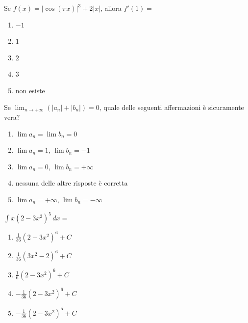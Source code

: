 \begin{quiz}
Se $f(x)=|\cos(\pi x)|^3+2|x|$, allora $f\prime(1)=$
\begin{enumerate}[label=\alph*),leftmargin=1.3cm,itemsep=3pt,topsep=5pt]
\item $-1$
\item $1$
\item $2$
\item $3$
\item non esiste
\end{enumerate}
\end{quiz}

\begin{quiz}
Se $\lim_{n\to+\infty}(|a_n|+|b_n|)=0$, quale delle seguenti affermazioni \`e sicuramente vera?
\begin{enumerate}[label=\alph*),leftmargin=1.3cm,itemsep=3pt,topsep=5pt]
\item $\lim a_n=\lim b_n=0$
\item $\lim a_n=1$, $\lim b_n=-1$
\item $\lim a_n=0$, $\lim b_n=+\infty$
\item nessuna delle altre risposte \`e corretta
\item $\lim a_n=+\infty$, $\lim b_n=-\infty$
\end{enumerate}
\end{quiz}

\begin{quiz}
$\displaystyle\int x(2-3x^2)^5\,dx=$
\begin{enumerate}[label=\alph*),leftmargin=1.3cm,itemsep=3pt,topsep=5pt]
\item $\frac1{36}(2-3x^2)^6+C$
\item $\frac1{36}(3x^2-2)^6+C$
\item $\frac16(2-3x^2)^6+C$
\item $-\frac1{36}(2-3x^2)^6+C$
\item $-\frac1{36}(2-3x^2)^5+C$
\end{enumerate}
\end{quiz}

